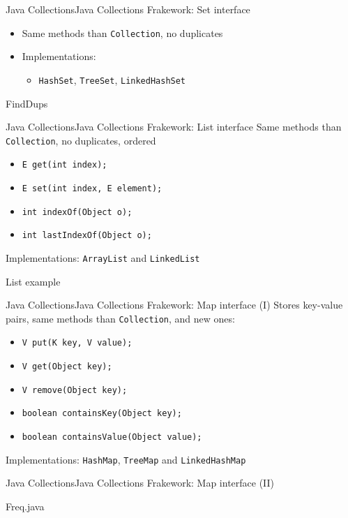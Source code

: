 \documentclass[10pt,compress]{beamer} %
\begin{document}
\begin{frame}{Java Collections}{Java Collections Frakework: Set interface}
	\begin{itemize}
	\item Same methods than \texttt{Collection}, no duplicates
	\item Implementations:
	\begin{itemize}
	\item \texttt{HashSet}, \texttt{TreeSet}, \texttt{LinkedHashSet}
	\end{itemize}
	\end{itemize}
	
	\vspace{-0.2cm}
	\begin{block}{FindDups}
	\vspace{-0.2cm}
		
	\vspace{-0.2cm}
	\end{block}

\end{frame}

\begin{frame}{Java Collections}{Java Collections Frakework: List interface}
	Same methods than \texttt{Collection}, no duplicates, ordered
	\begin{itemize}
		\item \texttt{E get(int index);}
		\item \texttt{E set(int index, E element);}
		\item \texttt{int indexOf(Object o);}
		\item \texttt{int lastIndexOf(Object o);}
	\end{itemize}
	Implementations: \texttt{ArrayList} and \texttt{LinkedList}
	\begin{block}{List example}
	\vspace{-0.2cm}
		
	\vspace{-0.2cm}
	\end{block}
\end{frame}

\begin{frame}{Java Collections}{Java Collections Frakework: Map interface (I)}
	Stores key-value pairs, same methods than \texttt{Collection}, and new ones:
	\begin{itemize}
		\item \texttt{V put(K key, V value);}
		\item \texttt{V get(Object key);}
		\item \texttt{V remove(Object key);}
		\item \texttt{boolean containsKey(Object key);}
		\item \texttt{boolean containsValue(Object value);}
	\end{itemize}
	Implementations: \texttt{HashMap}, \texttt{TreeMap} and \texttt{LinkedHashMap}
\end{frame}

\begin{frame}{Java Collections}{Java Collections Frakework: Map interface (II)}
	\begin{block}{Freq.java}
	\vspace{-0.2cm}
		
	\vspace{-0.2cm}
	\end{block}
\end{frame}
\end{document}
